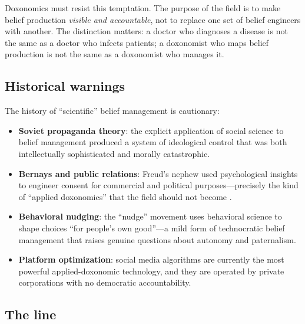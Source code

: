 Doxonomics must resist this temptation.
The purpose of the field is to make belief production \emph{visible and accountable}, not to replace one set of belief engineers with another.
The distinction matters: a doctor who diagnoses a disease is not the same as a doctor who infects patients; a doxonomist who maps belief production is not the same as a doxonomist who manages it.

\subsection{Historical warnings}

The history of ``scientific'' belief management is cautionary:
\begin{itemize}[nosep]
  \item \textbf{Soviet propaganda theory}: the explicit application of social science to belief management produced a system of ideological control that was both intellectually sophisticated and morally catastrophic.
  \item \textbf{Bernays and public relations}: Freud's nephew used psychological insights to engineer consent for commercial and political purposes---precisely the kind of ``applied doxonomics'' that the field should not become \autocite{bernays1928}.
  \item \textbf{Behavioral nudging}: the ``nudge'' movement uses behavioral science to shape choices ``for people's own good''---a mild form of technocratic belief management that raises genuine questions about autonomy and paternalism.
  \item \textbf{Platform optimization}: social media algorithms are currently the most powerful applied-doxonomic technology, and they are operated by private corporations with no democratic accountability.
\end{itemize}

\subsection{The line}


